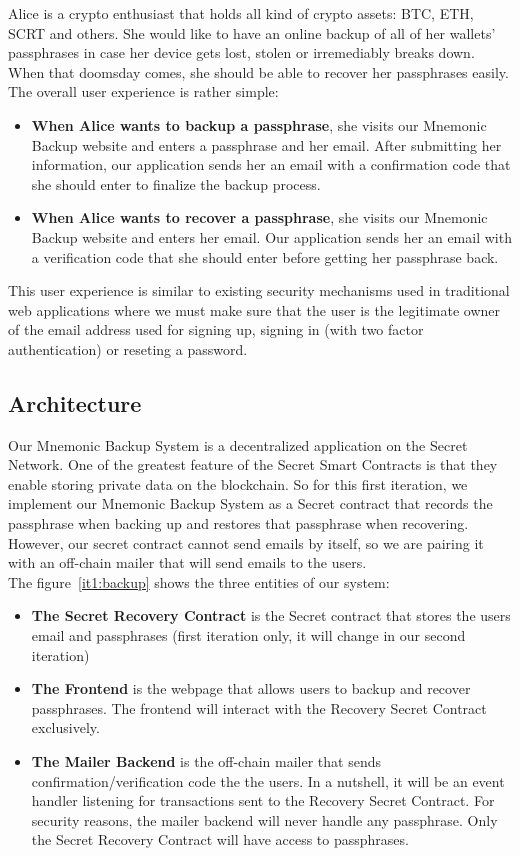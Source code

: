 \documentclass[12pt]{article}
\begin{document}
Alice is a crypto enthusiast that holds all kind of crypto assets: BTC, ETH, SCRT and others. She would like to have an online backup of all of her wallets' passphrases in case her device gets lost, stolen or irremediably breaks down. When that doomsday comes, she should be able to recover her passphrases easily. The overall user experience is rather simple: 

\begin{itemize}
    \item {\bf When Alice wants to backup a passphrase}, she visits our Mnemonic Backup website and enters a passphrase and her email. After submitting her information, our application sends her an email with a confirmation code that she should enter to finalize the backup process. 
    \item {\bf When Alice wants to recover a passphrase}, she visits our Mnemonic Backup website and enters her email. Our application sends her an email with a verification code that she should enter before getting her passphrase back. 
\end{itemize}

This user experience is similar to existing security mechanisms used in traditional web applications where we must make sure that the user is the legitimate owner of the email address used for signing up, signing in (with two factor authentication) or reseting a password.

\subsection{Architecture}

Our Mnemonic Backup System is a decentralized application on the Secret Network. One of the greatest feature of the Secret Smart Contracts is that they enable storing private data on the blockchain. So for this first iteration, we implement our Mnemonic Backup System as a Secret contract that records the passphrase when backing up and restores that passphrase when recovering. However, our secret contract cannot send emails by itself, so we are pairing it with an off-chain mailer that will send emails to the users.\\

The figure~\ref{it1:backup} shows the three entities of our system:

\begin{itemize}
    \item {\bf The Secret Recovery Contract} is the Secret contract that stores the users email and passphrases (first iteration only, it will change in our second iteration)
    \item {\bf The Frontend} is the webpage that allows users to backup and recover passphrases. The frontend will interact with the Recovery Secret Contract exclusively. 
    \item {\bf The Mailer Backend} is the off-chain mailer that sends confirmation/verification code the the users. In a nutshell, it will be an event handler listening for transactions sent to the Recovery Secret Contract. For security reasons, the mailer backend will never handle any passphrase. Only the Secret Recovery Contract will have access to passphrases.
\end{itemize}
\end{document}
